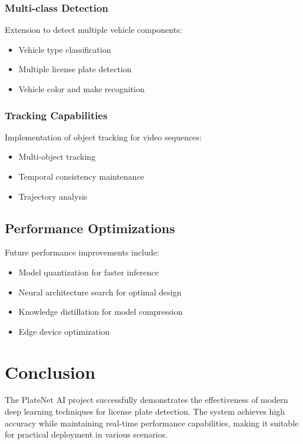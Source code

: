 \documentclass[12pt,a4paper]{article}
\begin{document}
\subsubsection{Multi-class Detection}

Extension to detect multiple vehicle components:

\begin{itemize}
    \item Vehicle type classification
    \item Multiple license plate detection
    \item Vehicle color and make recognition
\end{itemize}

\subsubsection{Tracking Capabilities}

Implementation of object tracking for video sequences:

\begin{itemize}
    \item Multi-object tracking
    \item Temporal consistency maintenance
    \item Trajectory analysis
\end{itemize}

\subsection{Performance Optimizations}

Future performance improvements include:

\begin{itemize}
    \item Model quantization for faster inference
    \item Neural architecture search for optimal design
    \item Knowledge distillation for model compression
    \item Edge device optimization
\end{itemize}

\section{Conclusion}

The PlateNet AI project successfully demonstrates the effectiveness of modern deep learning techniques for license plate detection. The system achieves high accuracy while maintaining real-time performance capabilities, making it suitable for practical deployment in various scenarios.
\end{document}
